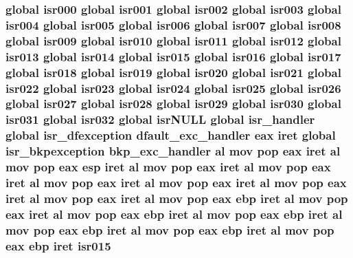 \subsubsection[{\texorpdfstring{isr015}{isr015}}]{\setlength{\rightskip}{0pt plus 5cm}global {\bf isr000} global {\bf isr001} global {\bf isr002} global {\bf isr003} global {\bf isr004} global {\bf isr005} global {\bf isr006} global {\bf isr007} global {\bf isr008} global {\bf isr009} global {\bf isr010} global {\bf isr011} global {\bf isr012} global {\bf isr013} global {\bf isr014} global isr015 global {\bf isr016} global {\bf isr017} global {\bf isr018} global {\bf isr019} global {\bf isr020} global {\bf isr021} global {\bf isr022} global {\bf isr023} global {\bf isr024} global {\bf isr025} global {\bf isr026} global {\bf isr027} global {\bf isr028} global {\bf isr029} global {\bf isr030} global {\bf isr031} global isr032 global isr\+N\+U\+LL global isr\+\_\+handler global {\bf isr\+\_\+dfexception} {\bf dfault\+\_\+exc\+\_\+handler} eax iret global {\bf isr\+\_\+bkpexception} {\bf bkp\+\_\+exc\+\_\+handler} {\bf al} {\bf mov} pop eax iret {\bf al} {\bf mov} pop eax esp iret {\bf al} {\bf mov} pop eax iret {\bf al} {\bf mov} pop eax iret {\bf al} {\bf mov} pop eax iret {\bf al} {\bf mov} pop eax iret {\bf al} {\bf mov} pop eax iret {\bf al} {\bf mov} pop eax iret {\bf al} {\bf mov} pop eax ebp iret {\bf al} {\bf mov} pop eax iret {\bf al} {\bf mov} pop eax ebp iret {\bf al} {\bf mov} pop eax ebp iret {\bf al} {\bf mov} pop eax ebp iret {\bf al} {\bf mov} pop eax ebp iret {\bf al} {\bf mov} pop eax ebp iret isr015}\hypertarget{isrs_8as_ad85d404322556df450a360d582e610aa}{}\label{isrs_8as_ad85d404322556df450a360d582e610aa}

